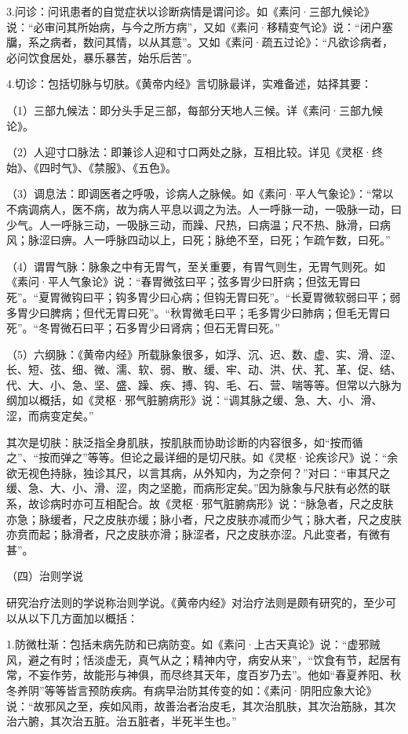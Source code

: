 \documentclass[12pt,UTF8]{ctexbook}
\begin{document}
3.问诊：问讯患者的自觉症状以诊断病情是谓问诊。如《素问·三部九候论》说：“必审问其所始病，与今之所方病”，又如《素问·移精变气论》说：“闭户塞牖，系之病者，数问其情，以从其意”。又如《素问·疏五过论》：“凡欲诊病者，必问饮食居处，暴乐暴苦，始乐后苦”。

4.切诊：包括切脉与切肤。《黄帝内经》言切脉最详，实难备述，姑择其要：

（1）三部九候法：即分头手足三部，每部分天地人三候。详《素问·三部九候论》。

（2）人迎寸口脉法：即兼诊人迎和寸口两处之脉，互相比较。详见《灵枢·终始》、《四时气》、《禁服》、《五色》。

（3）调息法：即调医者之呼吸，诊病人之脉候。如《素问·平人气象论》：“常以不病调病人，医不病，故为病人平息以调之为法。人一呼脉一动，一吸脉一动，曰少气。人一呼脉三动，一吸脉三动，而躁、尺热，曰病温；尺不热、脉滑，曰病风；脉涩曰痹。人一呼脉四动以上，曰死；脉绝不至，曰死；乍疏乍数，曰死。”

（4）谓胃气脉：脉象之中有无胃气，至关重要，有胃气则生，无胃气则死。如《素问·平人气象论》说：“春胃微弦曰平；弦多胃少曰肝病；但弦无胃曰死”。“夏胃微钩曰平；钩多胃少曰心病；但钩无胃曰死”。“长夏胃微软弱曰平；弱多胃少曰脾病；但代无胃曰死”。“秋胃微毛曰平；毛多胃少曰肺病；但毛无胃曰死”。“冬胃微石曰平；石多胃少曰肾病；但石无胃曰死。”

（5）六纲脉：《黄帝内经》所载脉象很多，如浮、沉、迟、数、虚、实、滑、涩、长、短、弦、细、微、濡、软、弱、散、缓、牢、动、洪、伏、芤、革、促、结、代、大、小、急、坚、盛、躁、疾、搏、钩、毛、石、营、喘等等。但常以六脉为纲加以概括，如《灵枢·邪气脏腑病形》说：“调其脉之缓、急、大、小、滑、涩，而病变定矣。”

其次是切肤：肤泛指全身肌肤，按肌肤而协助诊断的内容很多，如“按而循之”、“按而弹之”等等。但论之最详细的是切尺肤。如《灵枢·论疾诊尺》说：“余欲无视色持脉，独诊其尺，以言其病，从外知内，为之奈何？”对曰：“审其尺之缓、急、大、小、滑、涩，肉之坚脆，而病形定矣。”因为脉象与尺肤有必然的联系，故诊病时亦可互相配合。故《灵枢·邪气脏腑病形》说：“脉急者，尺之皮肤亦急；脉缓者，尺之皮肤亦缓；脉小者，尺之皮肤亦减而少气；脉大者，尺之皮肤亦贲而起；脉滑者，尺之皮肤亦滑；脉涩者，尺之皮肤亦涩。凡此变者，有微有甚”。

（四）治则学说

研究治疗法则的学说称治则学说。《黄帝内经》对治疗法则是颇有研究的，至少可以从以下几方面加以概括：

1.防微杜渐：包括未病先防和已病防变。如《素问·上古天真论》说：“虚邪贼风，避之有时；恬淡虚无，真气从之；精神内守，病安从来”，“饮食有节，起居有常，不妄作劳，故能形与神俱，而尽终其天年，度百岁乃去”。他如“春夏养阳、秋冬养阴”等等皆言预防疾病。有病早治防其传变的如：《素问·阴阳应象大论》说：“故邪风之至，疾如风雨，故善治者治皮毛，其次治肌肤，其次治筋脉，其次治六腑，其次治五脏。治五脏者，半死半生也。”
\end{document}
